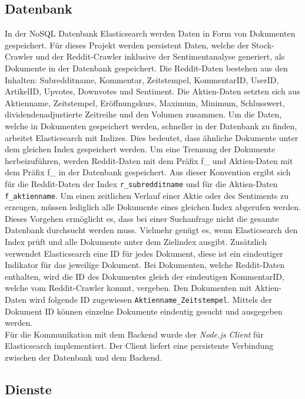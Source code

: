 \documentclass[a4paper, 10pt, conference]{IEEEtran}
\begin{document}
\subsection{Datenbank} \label{sub:database}
In der NoSQL Datenbank Elasticsearch werden Daten in Form von Dokumenten gespeichert. Für dieses Projekt werden persistent Daten, welche der Stock-Crawler und der Reddit-Crawler inklusive der Sentimentanalyse generiert, als Dokumente in der Datenbank gespeichert. Die Reddit-Daten bestehen aus den Inhalten: Subredditname, Kommentar, Zeitstempel, KommentarID, UserID, ArtikelID, Upvotes, Downvotes und Sentiment. Die Aktien-Daten setzten sich aus Aktienname, Zeitstempel, Eröffnungskurs, Maximum, Minimum, Schlusswert, dividendenadjustierte Zeitreihe und den Volumen zusammen. Um die Daten, welche in Dokumenten gespeichert werden, schneller in der Datenbank zu finden, arbeitet Elasticsearch mit Indizes. Dies bedeutet, dass ähnliche Dokumente unter dem gleichen Index gespeichert werden. Um eine Trennung der Dokumente herbeizuführen, werden Reddit-Daten mit dem Präfix f\_ und Aktien-Daten mit dem Präfix f\_ in der Datenbank gespeichert. Aus dieser Konvention ergibt sich für die Reddit-Daten der Index \texttt{\/r\_subredditname} und für die Aktien-Daten \texttt{\/f\_aktienname}. Um einen zeitlichen Verlauf einer Aktie oder des Sentiments zu erzeugen, müssen lediglich alle Dokumente eines gleichen Index abgerufen werden. Dieses Vorgehen ermöglicht es, dass bei einer Suchanfrage nicht die gesamte Datenbank durchsucht werden muss. Vielmehr genügt es, wenn Elasticsearch den Index prüft und alle Dokumente unter dem Zielindex ausgibt. Zusätzlich verwendet Elasticsearch eine ID für jedes Dokument, diese ist ein eindeutiger Indikator für das jeweilige Dokument. Bei Dokumenten, welche Reddit-Daten enthalten, wird die ID des Dokumentes gleich der eindeutigen KommentarID, welche vom Reddit-Crawler kommt, vergeben. Den Dokumenten mit Aktien-Daten wird folgende ID zugewiesen \texttt{\/Aktienname\_Zeitstempel}. Mittels der Dokument ID können einzelne Dokumente eindeutig gesucht und ausgegeben werden.\\
Für die Kommunikation mit dem Backend wurde der \textit{Node.js Client} für Elasticsearch implementiert. Der Client liefert eine persistente Verbindung zwischen der Datenbank und dem Backend.

\subsection{Dienste} \label{sub:services}
\end{document}
